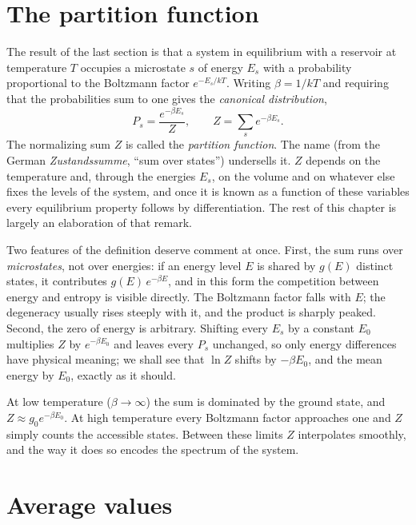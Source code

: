 \documentclass[10pt,twoside]{book}
\begin{document}
\section{The partition function}

The result of the last section is that a system in equilibrium with a reservoir at temperature $T$ occupies a microstate $s$ of energy $E_s$ with a probability proportional to the Boltzmann factor $e^{-E_s/kT}$. Writing $\beta = 1/kT$ and requiring that the probabilities sum to one gives the \emph{canonical distribution},
\begin{equation}
  P_s = \frac{e^{-\beta E_s}}{Z}, \qquad Z = \sum_s e^{-\beta E_s}.
\end{equation}
The normalizing sum $Z$ is called the \emph{partition function}. The name (from the German \emph{Zustandssumme}, ``sum over states'') undersells it. $Z$ depends on the temperature and, through the energies $E_s$, on the volume and on whatever else fixes the levels of the system, and once it is known as a function of these variables every equilibrium property follows by differentiation. The rest of this chapter is largely an elaboration of that remark.

Two features of the definition deserve comment at once. First, the sum runs over \emph{microstates}, not over energies: if an energy level $E$ is shared by $g(E)$ distinct states, it contributes $g(E)\,e^{-\beta E}$, and in this form the competition between energy and entropy is visible directly. The Boltzmann factor falls with $E$; the degeneracy usually rises steeply with it, and the product is sharply peaked. Second, the zero of energy is arbitrary. Shifting every $E_s$ by a constant $E_0$ multiplies $Z$ by $e^{-\beta E_0}$ and leaves every $P_s$ unchanged, so only energy differences have physical meaning; we shall see that $\ln Z$ shifts by $-\beta E_0$, and the mean energy by $E_0$, exactly as it should.

At low temperature ($\beta \to \infty$) the sum is dominated by the ground state, and $Z \approx g_0 e^{-\beta E_0}$. At high temperature every Boltzmann factor approaches one and $Z$ simply counts the accessible states. Between these limits $Z$ interpolates smoothly, and the way it does so encodes the spectrum of the system.

\section{Average values}
\end{document}
